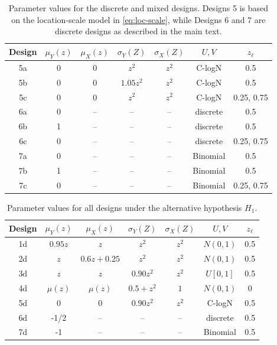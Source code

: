 \documentclass[11pt]{article}
\numberwithin{equation}{section}
\begin{document}
\begin{table}[h]\footnotesize
  \centering
  \begin{tabular}{ccccccc}\hline
      Design &$\mu_Y(z)$ &$\mu_X(z)$  & $\sigma_Y(Z)$ & $\sigma_X(Z)$  & $U,V$ & $z_{\ell}$  \\ \hline
       5a&  0& 0&  $z^2$&  $z^2$      &  C-logN&  0.5\\
       5b&  0& 0&  $1.05z^2$&  $z^2$  & C-logN & 0.5 \\
       5c&  0& 0&  $z^2$&  $z^2$      &  C-logN& 0.25, 0.75\\ \hline
       6a&  0 & --&  -- &   --        & discrete & 0.5 \\
       6b&  1 & --&  -- &  --         & discrete & 0.5 \\
       6c&  0 & --&  -- &  --         &  discrete& 0.25, 0.75\\ \hline
       7a&  0 & --&  --&  --          & Binomial & 0.5 \\
       7b&  1 & --&  --&  --          & Binomial & 0.5 \\
       7c&  0 & --&  --&  --          &  Binomial& 0.25, 0.75\\ \hline 
  \end{tabular}
  \caption{\footnotesize Parameter values for the discrete and mixed designs. Designs 5 is based on the location-scale model in \eqref{eq:loc-scale}, while Designs 6 and 7 are discrete designs as described in the main text.}
  \label{tab:Simu-Designs-57}
\end{table}

\begin{table}[h]\footnotesize
  \centering
  \begin{tabular}{ccccccc}\hline
      Design &$\mu_Y(z)$ &$\mu_X(z)$  & $\sigma_Y(Z)$ & $\sigma_X(Z)$  & $U,V$ & $z_{\ell}$  \\ \hline
1d&  $0.95z$&  $z$&  $z^2$&  $z^2$&         $N(0,1)$& 0.5\\ 
2d&  $z$ & $0.6z + 0.25$&   $z^2$&  $z^2$&  $N(0,1)$&  0.5\\ 
3d&  $z$&  $z$&     $0.90z^2$& $z^2$&       $U[0,1]$&  0.5\\ 
4d&  $\mu(z)$ & $\mu(z)$&  $0.5 + z^2$ &  $1$&  $N(0,1)$&  0 \\ 
5d&  0& 0&  $0.90z^2$&  $z^2$               & C-logN & 0.5 \\ 
6d&  -1/2 & --&  -- &  --                   & discrete & 0.5 \\ 
7d&  -1 & --&  --&  --                      & Binomial & 0.5 \\ \hline 
  \end{tabular}
  \caption{\footnotesize Parameter values for all designs under the alternative hypothesis $H_1$.}
  \label{tab:Simu-cased}
\end{table}
\end{document}

